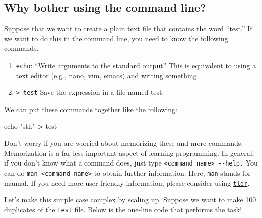 \documentclass[
]{book}
\newenvironment{Shaded}{\begin{snugshade}}{\end{snugshade}}
\newcommand{\BuiltInTok}[1]{#1}
\newcommand{\ControlFlowTok}[1]{\textcolor[rgb]{0.13,0.29,0.53}{\textbf{#1}}}
\newcommand{\DataTypeTok}[1]{\textcolor[rgb]{0.13,0.29,0.53}{#1}}
\newcommand{\DecValTok}[1]{\textcolor[rgb]{0.00,0.00,0.81}{#1}}
\newcommand{\FunctionTok}[1]{\textcolor[rgb]{0.13,0.29,0.53}{\textbf{#1}}}
\newcommand{\KeywordTok}[1]{\textcolor[rgb]{0.13,0.29,0.53}{\textbf{#1}}}
\newcommand{\NormalTok}[1]{#1}
\newcommand{\OperatorTok}[1]{\textcolor[rgb]{0.81,0.36,0.00}{\textbf{#1}}}
\newcommand{\StringTok}[1]{\textcolor[rgb]{0.31,0.60,0.02}{#1}}
\newcommand{\VariableTok}[1]{\textcolor[rgb]{0.00,0.00,0.00}{#1}}
\providecommand{\tightlist}{%
  \setlength{\itemsep}{0pt}\setlength{\parskip}{0pt}}
\begin{document}
\subsection{Why bother using the command line?}\label{why-bother-using-the-command-line}

Suppose that we want to create a plain text file that contains the word ``test.'' If we want to do this in the command line, you need to know the following commands.

\begin{enumerate}
\def\labelenumi{\arabic{enumi}.}
\tightlist
\item
  \texttt{echo}: ``Write arguments to the standard output'' This is equivalent to using a text editor (e.g., nano, vim, emacs) and writing something.
\item
  \texttt{\textgreater{}\ test} Save the expression in a file named test.
\end{enumerate}

We can put these commands together like the following:

\begin{Shaded}
\begin{Highlighting}[]
\BuiltInTok{echo} \StringTok{"sth"} \OperatorTok{\textgreater{}}\NormalTok{ test}
\end{Highlighting}
\end{Shaded}

Don't worry if you are worried about memorizing these and more commands. Memorization is a far less important aspect of learning programming. In general, if you don't know what a command does, just type \texttt{\textless{}command\ name\textgreater{}\ -\/-help.} You can do \texttt{man\ \textless{}command\ name\textgreater{}} to obtain further information. Here, \texttt{man} stands for manual. If you need more user-friendly information, please consider using \href{https://tldr.sh/}{\texttt{tldr}}.

Let's make this simple case complex by scaling up. Suppose we want to make 100 duplicates of the \texttt{test} file. Below is the one-line code that performs the task!

\begin{Shaded}
\end{Shaded}
\end{document}
